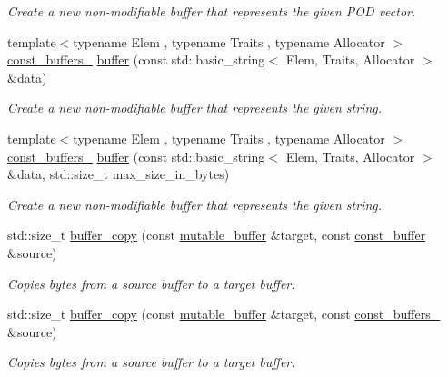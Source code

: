 \begin{DoxyCompactItemize}
\begin{DoxyCompactList}\small\item\em Create a new non-\/modifiable buffer that represents the given P\+O\+D vector. \end{DoxyCompactList}\item 
{\footnotesize template$<$typename Elem , typename Traits , typename Allocator $>$ }\\\hyperlink{classasio_1_1const__buffers__1}{const\+\_\+buffers\+\_} \hyperlink{group__buffer_gafe609d07578ac226c777107fbe51eff5}{buffer} (const std\+::basic\+\_\+string$<$ Elem, Traits, Allocator $>$ \&data)
\begin{DoxyCompactList}\small\item\em Create a new non-\/modifiable buffer that represents the given string. \end{DoxyCompactList}\item 
{\footnotesize template$<$typename Elem , typename Traits , typename Allocator $>$ }\\\hyperlink{classasio_1_1const__buffers__1}{const\+\_\+buffers\+\_} \hyperlink{group__buffer_gaa04e7aa3e90adacebceb59007629e923}{buffer} (const std\+::basic\+\_\+string$<$ Elem, Traits, Allocator $>$ \&data, std\+::size\+\_\+t max\+\_\+size\+\_\+in\+\_\+bytes)
\begin{DoxyCompactList}\small\item\em Create a new non-\/modifiable buffer that represents the given string. \end{DoxyCompactList}\item 
std\+::size\+\_\+t \hyperlink{group__buffer__copy_ga8bc8cbf49a91e58205de746721d614d8}{buffer\+\_\+copy} (const \hyperlink{classasio_1_1mutable__buffer}{mutable\+\_\+buffer} \&target, const \hyperlink{classasio_1_1const__buffer}{const\+\_\+buffer} \&source)
\begin{DoxyCompactList}\small\item\em Copies bytes from a source buffer to a target buffer. \end{DoxyCompactList}\item 
std\+::size\+\_\+t \hyperlink{group__buffer__copy_ga09726c974288624f654a593b06ba1a0c}{buffer\+\_\+copy} (const \hyperlink{classasio_1_1mutable__buffer}{mutable\+\_\+buffer} \&target, const \hyperlink{classasio_1_1const__buffers__1}{const\+\_\+buffers\+\_} \&source)
\begin{DoxyCompactList}\small\item\em Copies bytes from a source buffer to a target buffer. \end{DoxyCompactList}\item 

\end{DoxyCompactItemize}

